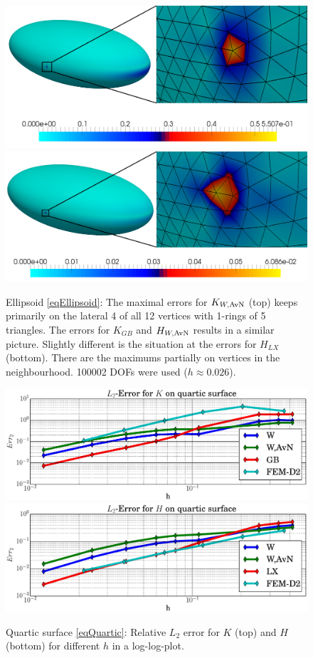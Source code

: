   \begin{figure}
    \centering\includegraphics[width=.49\textwidth]{bilder/ellipsoid/ErrView.jpg}
    \centering\includegraphics[width=.49\textwidth]{bilder/ellipsoid/ErrViewHLX.jpg}
    \caption{Ellipsoid \eqref{eqEllipsoid}:
                  The maximal errors for \( K_{W,\text{AvN}} \) (top) keeps primarily  on the lateral 4 of all 12 vertices with 1-rings of 5 triangles.
                  The errors for \( K_{GB} \) and \( H_{W,\text{AvN}} \) results in a similar picture.
                  Slightly different is the situation at the errors for \( H_{LX} \) (bottom).
                  There are the maximums partially on vertices in the neighbourhood. 
                  100002 DOFs were used (\( h\approx 0.026 \)).}
    \label{figEllipsoidErrView}
  \end{figure}


  \begin{figure}
    \centering\includegraphics[width=.49\textwidth]{bilder/quartic/L2K.eps}
    \centering\includegraphics[width=.49\textwidth]{bilder/quartic/L2H.eps}
    \caption{Quartic surface \eqref{eqQuartic}: Relative \( L_{2} \) error for \( K \) (top) and
                                                     \( H \) (bottom) for different \( h \) in a log-log-plot.}
    \label{figQuarticL2Err}
  \end{figure}



